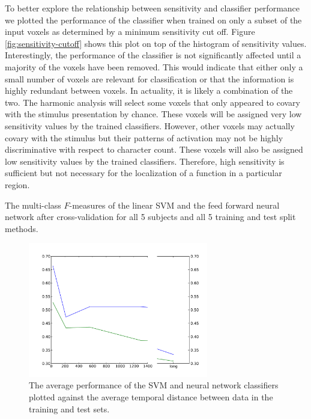 \documentclass[preprint,authoryear,12pt]{elsarticle}
\begin{document}
To better explore the relationship between sensitivity and classifier performance we plotted the performance of the classifier when trained on only a subset of the input voxels as determined by a minimum sensitivity cut off.
Figure \ref{fig:sensitivity-cutoff} shows this plot on top of the histogram of sensitivity values.
Interestingly, the performance of the classifier is not significantly affected until a majority of the voxels have been removed.
This would indicate that either only a small number of voxels are relevant for classification or that the information is highly redundant between voxels.
In actuality, it is likely a combination of the two.
The harmonic analysis will select some voxels that only appeared to covary with the stimulus presentation by chance.
These voxels will be assigned very low sensitivity values by the trained classifiers.
However, other voxels may actually covary with the stimulus but their patterns of activation may not be highly discriminative with respect to character count.
These voxels will also be assigned low sensitivity values by the trained classifiers.
Therefore, high sensitivity is sufficient but not necessary for the localization of a function in a particular region.

\begin{table}
\centering

\caption{The multi-class $F$-measures of the linear SVM and the feed forward neural network after cross-validation for all 5 subjects and all 5 training and test split methods. }
\label{tab:results}
\end{table}

\begin{figure}
\centering
\includegraphics[width=0.7\textwidth]{figures/performance-verse-temporal-distance}
\caption{The average performance of the SVM and neural network classifiers plotted against the average temporal distance between data in the training and test sets.}
\label{fig:performance-verse-temporal-distance}
\end{figure}
\end{document}
